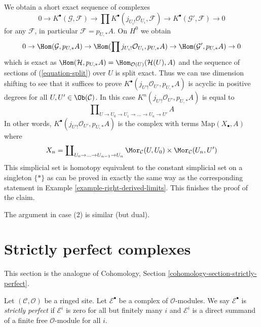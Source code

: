 \begin{example}
We obtain a short exact sequence of complexes
$$
0 \to
K^\bullet(\mathcal{G}, \mathcal{F}) \to
\prod K^\bullet(j_{U_i!}\mathcal{O}_{U_i}, \mathcal{F}) \to
K^\bullet(\mathcal{G}', \mathcal{F}) \to 0
$$
for any $\mathcal{F}$, in particular $\mathcal{F} = p_{U, *}A$.
On $H^0$ we obtain
$$
0 \to \Hom(\mathcal{G}, p_{U, *}A) \to
\Hom(\prod j_{U_i!}\mathcal{O}_{U_i}, p_{U, *}A) \to
\Hom(\mathcal{G}', p_{U, *}A) \to 0
$$
which is exact as
$\Hom(\mathcal{H}, p_{U, *}A) = \Hom_{\mathcal{O}(U)}(\mathcal{H}(U), A)$
and the sequence of sections of (\ref{equation-split}) over $U$ is split exact.
Thus we can use dimension shifting to see that it suffices to prove
$K^\bullet(j_{U'!}\mathcal{O}_{U'}, p_{U, *}A)$ is acyclic in positive
degrees for all $U, U' \in \Ob(\mathcal{C})$. In this case
$K^n(j_{U'!}\mathcal{O}_{U'}, p_{U, *}A)$ is equal to
$$
\prod\nolimits_{U \to U_0 \to U_1 \to \ldots \to U_n \to U'} A
$$
In other words, $K^\bullet(j_{U'!}\mathcal{O}_{U'}, p_{U, *}A)$
is the complex with terms $\text{Map}(X_\bullet, A)$ where
$$
X_n = \coprod\nolimits_{U_0 \to \ldots \to U_{n - 1} \to U_n}
\Mor_\mathcal{C}(U, U_0) \times \Mor_\mathcal{C}(U_n, U')
$$
This simplicial set is homotopy equivalent to the constant simplicial
set on a singleton $\{*\}$ as can be proved in exactly the same way
as the corresponding statement in Example \ref{example-right-derived-limits}.
This finishes the proof of the claim.

\medskip\noindent
The argument in case (2) is similar (but dual).
\end{example}










\section{Strictly perfect complexes}
\label{section-strictly-perfect}

\noindent
This section is the analogue of
Cohomology, Section \ref{cohomology-section-strictly-perfect}.

\begin{definition}
\label{definition-strictly-perfect}
Let $(\mathcal{C}, \mathcal{O})$ be a ringed site.
Let $\mathcal{E}^\bullet$ be a complex of $\mathcal{O}$-modules.
We say $\mathcal{E}^\bullet$ is {\it strictly perfect}
if $\mathcal{E}^i$ is zero for all but finitely many $i$ and
$\mathcal{E}^i$ is a direct summand of a finite free
$\mathcal{O}$-module for all $i$.
\end{definition}

